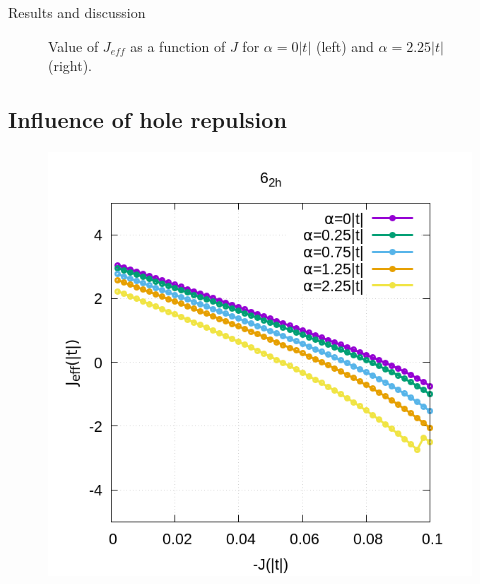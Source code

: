 \documentclass[12pt,twoside]{report}
\begin{document}
\begin{chapter}{Results and discussion}
\begin{figure}[h!]
\begin{minipage}{0.4\textwidth}
		\end{minipage}
		\caption{\label{fig_arj} Value of $J_{eff}$ as a function of $J$ for $\alpha=0|t|$ (left) and $\alpha=2.25|t|$ (right). }
	\end{figure}

	
	
	
	\subsection{Influence of hole repulsion}
	\begin{figure}[h!]
		\centering
		\hspace{-2cm}
		\begin{minipage}{0.4\textwidth}
			\includegraphics[scale=0.4]{Jeff_vs_J_ar2.png}
		\end{minipage}
		\hspace{2cm}
		\begin{minipage}{0.4\textwidth}

\end{minipage}
\end{figure}
\end{chapter}
\end{document}
